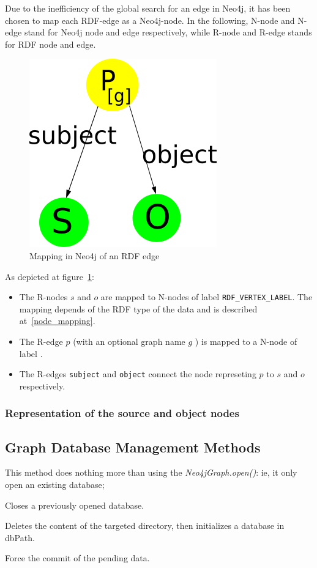 \documentclass[12pt,a4paper]{memoir} %
\begin{document}
 Due to the inefficiency of the global search for an edge in Neo4j, it has been chosen to map each RDF-edge as a Neo4j-node. In the following, N-node and N-edge stand for Neo4j node and edge respectively, while R-node and R-edge stands for RDF node and edge. 

\begin{figure}[hbtp]
\centering
\includegraphics[scale=0.5]{figures/neo4jMapping.png}
\caption{Mapping in Neo4j of an RDF edge}
\label{fig:neo4jEdgeMapping}
\end{figure}

As depicted at figure~\ref{fig:neo4jEdgeMapping}:
\begin{itemize}
\item The R-nodes $s$ and $o$ are mapped to N-nodes of label \texttt{RDF_VERTEX_LABEL}. The mapping depends of the RDF type of the data and is described at~\ref{node_mapping}.
\item The R-edge $p$ (with an optional graph name $g$ ) is mapped to a N-node of label . 
\item The R-edges \texttt{subject} and \texttt{object} connect the node represeting $p$ to $s$ and $o$ respectively.
\end{itemize}

\subsubsection{Representation of the source and object nodes\label{node_mapping}}

\subsection{Graph Database Management Methods}
\begin{description}[align=left]
	\item[openDatabase] This method does nothing more than using the \textit{Neo4jGraph.open()}: ie, it only open an existing database;
	\item[closeDatabase] Closes a previously opened database.
	\item[createDatabase(String dbPath)] Deletes the content of the targeted directory, then initializes a database in dbPath.
	\item[commit] Force the commit of the pending data.
\end{description}
\end{document}
